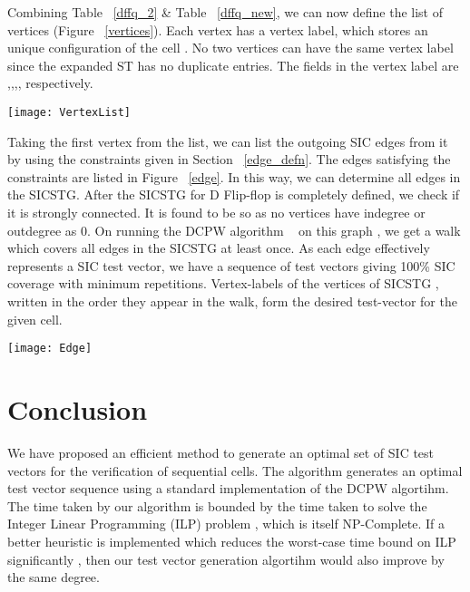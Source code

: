 \documentclass[final]{ieee}
\begin{document}
Combining Table ~\ref{dffq_2} \& Table ~\ref{dffq_new}, we can now define the list of vertices (Figure ~\ref{vertices}). Each vertex has a vertex label, which stores an unique configuration of the cell . No two vertices can have the same vertex label since the expanded ST has no duplicate entries. The fields in the vertex label are ,,,, respectively.

\begin{figure*}[hbt]
\texttt{[image: VertexList]} 
\caption{Vertices for D flip-flop}
\label{vertices}
\end{figure*}

Taking the first vertex from the list, we can list the outgoing SIC edges from it by using the constraints given in Section ~\ref{edge_defn}. The edges satisfying the constraints are listed in Figure ~\ref{edge}. In this way, we can determine all edges in the SICSTG. After the SICSTG for D Flip-flop is completely defined, we check if it is strongly connected. It is found to be so as no vertices have indegree or outdegree as 0. On running the DCPW algorithm ~\cite{CPP} on this graph , we get a walk which covers all edges in the SICSTG at least once. As each edge effectively represents a SIC test vector, we have a sequence of test vectors giving 100\% SIC coverage with minimum repetitions. Vertex-labels of the vertices of SICSTG , written in the order they appear in the walk, form the desired test-vector for the given cell. 

\begin{figure*}[hbt]
\texttt{[image: Edge]} 
\caption{Outgoing edges from vertex labelled }
\label{edge}
\end{figure*}

\section{Conclusion}
We have proposed an efficient method to generate an optimal set of SIC test vectors for the verification of sequential cells. The algorithm generates an optimal test vector sequence using a standard implementation of the DCPW algortihm. The time taken by our algorithm is bounded by the time taken to solve the Integer Linear Programming (ILP) problem , which is itself NP-Complete. If a better heuristic is implemented which reduces the worst-case time bound on ILP significantly , then our test vector generation algortihm would also improve by the same degree.
\pagebreak
\end{document}
